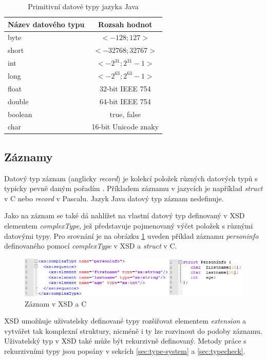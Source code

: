 \documentclass[czech,DP]{thesiskiv}
\begin{document}
\begin{table}[h]
	\centering
	\begin{tabular}{|l|c|}
		\hline
		Název datového typu & Rozsah hodnot \\
		\hline
		\hline
		byte & $<-128;127>$ \\
		\hline
		short & $<-32768;32767>$ \\
		\hline
		int & $<-2^{31};2^{31}-1>$ \\
		\hline
		long & $<-2^{63};2^{63}-1>$ \\
		\hline
		float & 32-bit IEEE 754\\
		\hline
		double & 64-bit IEEE 754\\
		\hline
		boolean & true, false \\
		\hline
		char & 16-bit Unicode znaky \\
		\hline
	\end{tabular}
	\caption{Primitivní datové typy jazyka Java}
	\label{tab:java-prim-types}
\end{table}

\subsection{Záznamy}

Datový typ záznam (anglicky \textit{record}) je kolekcí položek různých datových typů s typicky pevně daným pořadím \cite{felleisen2001}. Příkladem záznamu v jazycích je například \textit{struct} v C nebo \textit{record} v Pascalu. Jazyk Java datový typ záznam nedefinuje.

Jako na záznam se také dá nahlížet na vlastní datový typ definovaný v XSD elementem \textit{complexType}, jež představuje pojmenovaný výčet položek s různými datovými typy. Pro srovnání je na obrázku \ref{fig:record-xsd-c} uveden příklad záznamu \textit{personinfo} definovaného pomocí \textit{complexType} v XSD a \textit{struct} v C.

\begin{figure}[h]
	\centering
	\includegraphics[width=\linewidth]{record-example}
	\caption{Záznam v XSD a C}
	\label{fig:record-xsd-c}
\end{figure}

XSD umožňuje uživatelsky definované typy rozšiřovat elementem \textit{extension} a vytvářet tak komplexní struktury, nicméně i ty lze rozvinout do podoby záznamu. Uživatelský typ v XSD také může být rekurzivně definovaný. Metody práce s rekurzivními typy jsou popsány v sekcích \ref{sec:type-system} a \ref{sec:typecheck}.
\end{document}
